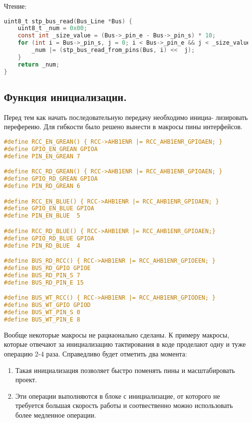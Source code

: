 \documentclass{bmstu}
\begin{document}
	Чтение:
	
	\begingroup
	\fontsize{12pt}{12pt}\selectfont
	\begin{lstlisting}[language=C]
uint8_t stp_bus_read(Bus_Line *Bus) {
	uint8_t _num = 0x00;
	const int _size_value = (Bus->_pin_e - Bus->_pin_s) * 10;
	for (int i = Bus->_pin_s, j = 0; i < Bus->_pin_e && j < _size_value; ++i, ++j) {
		_num |= (stp_bus_read_from_pins(Bus, i) <<  j);
	}
	return _num;
}
	\end{lstlisting}
	\endgroup
	
	\subsection{Функция инициализации.}
	
	Перед тем как начать последовательную передачу необходимо инициа- лизировать перефереию. Для гибкости было решено вынести в макросы пины интерфейсов.
	
	\begingroup
	\fontsize{12pt}{12pt}\selectfont
	\begin{lstlisting}[language=C]
#define RCC_EN_GREAN() { RCC->AHB1ENR |= RCC_AHB1ENR_GPIOAEN; }
#define GPIO_EN_GREAN GPIOA
#define PIN_EN_GREAN 7

#define RCC_RD_GREAN() { RCC->AHB1ENR |= RCC_AHB1ENR_GPIOAEN; }
#define GPIO_RD_GREAN GPIOA
#define PIN_RD_GREAN 6

#define RCC_EN_BLUE() { RCC->AHB1ENR |= RCC_AHB1ENR_GPIOAEN; }
#define GPIO_EN_BLUE GPIOA
#define PIN_EN_BLUE  5

#define RCC_RD_BLUE() { RCC->AHB1ENR |= RCC_AHB1ENR_GPIOAEN;}
#define GPIO_RD_BLUE GPIOA
#define PIN_RD_BLUE  4

#define BUS_RD_RCC() { RCC->AHB1ENR |= RCC_AHB1ENR_GPIOEEN; }
#define BUS_RD_GPIO GPIOE
#define BUS_RD_PIN_S 7
#define BUS_RD_PIN_E 15

#define BUS_WT_RCC() { RCC->AHB1ENR |= RCC_AHB1ENR_GPIODEN; }
#define BUS_WT_GPIO GPIOD
#define BUS_WT_PIN_S 0
#define BUS_WT_PIN_E 8
	\end{lstlisting}
	\endgroup
	
	Вообще некоторые макросы не рациаонально сделаны. К примеру макросы, которые отвечают за инициализацию тактирования в коде проделают одну и туже операцию 2-4 раза. Справедливо будет отметить два момента:
	
	\begin{enumerate}
		\item Такая инициализация позволяет быстро поменять пины и масштабировать проект.
		\item Эти операции выполняются в блоке с инициализацие, от которого не требуется большая скорость работы и соотвественно можно использовать более медленное операции.
	\end{enumerate}
	
\end{document}
